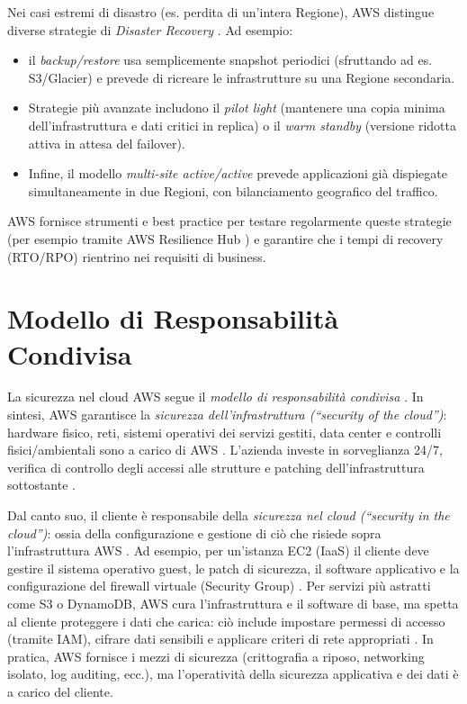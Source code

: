 \documentclass[a4paper,12pt]{report}
\begin{document}
Nei casi estremi di disastro (es. perdita di un’intera Regione), AWS distingue diverse strategie di \textit{Disaster Recovery} \cite{aws-well-architected}. Ad esempio:
\begin{itemize}
    \item il \textit{backup/restore} usa semplicemente snapshot periodici (sfruttando ad es. S3/Glacier) e prevede di ricreare le infrastrutture su una Regione secondaria.
    \item Strategie più avanzate includono il \textit{pilot light} (mantenere una copia minima dell’infrastruttura e dati critici in replica) o il \textit{warm standby} (versione ridotta attiva in attesa del failover).
    \item Infine, il modello \textit{multi-site active/active} prevede applicazioni già dispiegate simultaneamente in due Regioni, con bilanciamento geografico del traffico.
\end{itemize}
AWS fornisce strumenti e best practice per testare regolarmente queste strategie (per esempio tramite AWS Resilience Hub \cite{aws-resilience}) e garantire che i tempi di recovery (RTO/RPO) rientrino nei requisiti di business.

\section{Modello di Responsabilità Condivisa}
La sicurezza nel cloud AWS segue il \textit{modello di responsabilità condivisa} \cite{aws-shared-responsibility}. In sintesi, AWS garantisce la \textit{sicurezza dell’infrastruttura (“security of the cloud”)}: hardware fisico, reti, sistemi operativi dei servizi gestiti, data center e controlli fisici/ambientali sono a carico di AWS \cite{aws-shared-responsibility}. L’azienda investe in sorveglianza 24/7, verifica di controllo degli accessi alle strutture e patching dell’infrastruttura sottostante \cite{aws-shared-responsibility}.

Dal canto suo, il cliente è responsabile della \textit{sicurezza nel cloud (“security in the cloud”)}: ossia della configurazione e gestione di ciò che risiede sopra l’infrastruttura AWS \cite{aws-shared-responsibility}. Ad esempio, per un’istanza EC2 (IaaS) il cliente deve gestire il sistema operativo guest, le patch di sicurezza, il software applicativo e la configurazione del firewall virtuale (Security Group) \cite{aws-shared-responsibility}. Per servizi più astratti come S3 o DynamoDB, AWS cura l’infrastruttura e il software di base, ma spetta al cliente proteggere i dati che carica: ciò include impostare permessi di accesso (tramite IAM), cifrare dati sensibili e applicare criteri di rete appropriati \cite{aws-shared-responsibility}. In pratica, AWS fornisce i mezzi di sicurezza (crittografia a riposo, networking isolato, log auditing, ecc.), ma l’operatività della sicurezza applicativa e dei dati è a carico del cliente.
\end{document}
